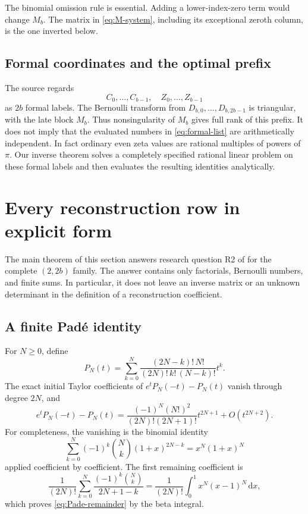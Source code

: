 \documentclass[11pt,letterpaper]{article}
\theoremstyle{definition}
\theoremstyle{remark}
\newcommand{\dd}{\,\mathrm d}
\numberwithin{equation}{section}
\begin{document}
The binomial omission rule is essential. Adding a lower-index-zero
term would change $M_b$. The matrix in \eqref{eq:M-system}, including
its exceptional zeroth column, is the one inverted below.

\subsection{Formal coordinates and the optimal prefix}

The source regards
\begin{equation}\label{eq:formal-list}
 C_0,\ldots,C_{b-1},\quad Z_0,\ldots,Z_{b-1}
\end{equation}
as $2b$ formal labels. The Bernoulli transform from $D_{b,0},\ldots,
D_{b,2b-1}$ is triangular, with the late block $M_b$. Thus
nonsingularity of $M_b$ gives full rank of this prefix.
It does not imply that the evaluated numbers in
\eqref{eq:formal-list} are arithmetically independent. In fact ordinary
even zeta values are rational multiples of powers of $\pi$.
Our inverse theorem solves a completely specified rational linear
problem on these formal labels and then evaluates the resulting
identities analytically.



\section{Every reconstruction row in explicit form}
\label{sec:inverse}

The main theorem of this section answers research question R2 of
\cite{incoming-bernoulli} for the complete $(2,2b)$ family. The answer
contains only factorials, Bernoulli numbers, and finite sums. In
particular, it does not leave an inverse matrix or an unknown
determinant in the definition of a reconstruction coefficient.

\subsection{A finite Pad\'e identity}

For $N\geq0$, define
\begin{equation}\label{eq:PN}
 P_N(t)=\sum_{k=0}^N
  \frac{(2N-k)!\,N!}{(2N)!\,k!\,(N-k)!}t^k.
\end{equation}
The exact initial Taylor coefficients of
$e^tP_N(-t)-P_N(t)$ vanish through degree $2N$, and
\begin{equation}\label{eq:Pade-remainder}
 e^tP_N(-t)-P_N(t)
 =\frac{(-1)^N(N!)^2}{(2N)!(2N+1)!}t^{2N+1}
   +O(t^{2N+2}).
\end{equation}
For completeness, the vanishing is the binomial identity
\[
 \sum_{k=0}^N(-1)^k\binom Nk(1+x)^{2N-k}
 =x^N(1+x)^N
\]
applied coefficient by coefficient. The first remaining coefficient is
\[
 \frac1{(2N)!}\sum_{k=0}^N
  \frac{(-1)^k\binom Nk}{2N+1-k}
 =\frac1{(2N)!}\int_0^1x^N(x-1)^N\dd x,
\]
which proves \eqref{eq:Pade-remainder} by the beta integral.
\end{document}
